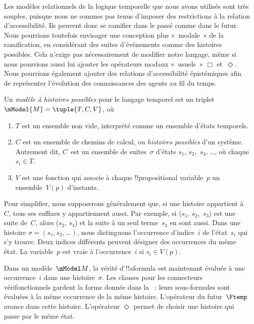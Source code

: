 \documentclass[../../../include/open-logic-section]{subfiles}
\begin{document}


Les modèles relationnels de la logique temporelle que nous avons
utilisés sont très souples, puisque nous ne sommes pas tenus
d'imposer des restrictions à la relation d'accessibilité. Ils
peuvent donc se ramifier dans le passé comme dans le futur. Nous
pourrions toutefois envisager une conception plus «~modale~» de la
ramification, en considérant des suites d'événements comme des
histoires possibles. Cela n'exige pas nécessairement de modifier
notre langage, même si nous pourrions aussi lui ajouter les
opérateurs modaux «~usuels~» $\Box$ et~$\Diamond$. Nous pourrions
également ajouter des relations d'accessibilité épistémiques afin
de représenter l'évolution des connaissances des agents au fil du
temps.

\begin{defn}
  Un \emph{modèle à histoires possibles} pour le langage temporel est
  un triplet $\mModel{M} = \tuple{T, C, V}$, où
  \begin{enumerate}
    \item $T$ est un ensemble non vide, interprété comme un ensemble
      d'états temporels.
    \item $C$ est un ensemble de chemins de calcul, ou
      \emph{histoires possibles} d'un système. Autrement dit,
      $C$~est un ensemble de suites~$\sigma$ d'états $s_1$, $s_2$,~$s_3$,
      \dots, où chaque $s_i \in T$.
    \item $V$ est une fonction qui associe à chaque !!{propositional
      variable}~$p$ un ensemble~$V(p)$ d'instants.
  \end{enumerate}
  Pour simplifier, nous supposerons généralement que, si une histoire
  appartient à~$C$, tous ses suffixes y appartiennent aussi. Par
  exemple, si ($s_1$, $s_2$,~$s_3$) est une suite de~$C$, alors
  ($s_2$, $s_3$) et la suite à un seul terme~$s_3$ en sont aussi.
  Dans une histoire $\sigma=(s_1,s_2,\ldots)$, nous distinguons
  l'occurrence d'indice~$i$ de l'état~$s_i$ qui s'y trouve. Deux
  indices différents peuvent désigner des occurrences du même
  état. La variable~$p$ est vraie à l'occurrence~$i$ si
  $s_i \in V(p)$.
\end{defn}

Dans un modèle~$\mModel M$, la vérité d'!!a{formula} est
maintenant évaluée à une occurrence~$i$ dans une histoire~$\sigma$.
Les clauses pour les connecteurs vérifonctionnels gardent la forme
donnée dans la~ : leurs sous-formules
sont évaluées à la même occurrence de la même histoire. L'opérateur
du futur~$\Ftemp$ avance dans cette histoire. L'opérateur
$\Diamond$ permet de choisir une histoire qui passe par le même état.
\end{document}
